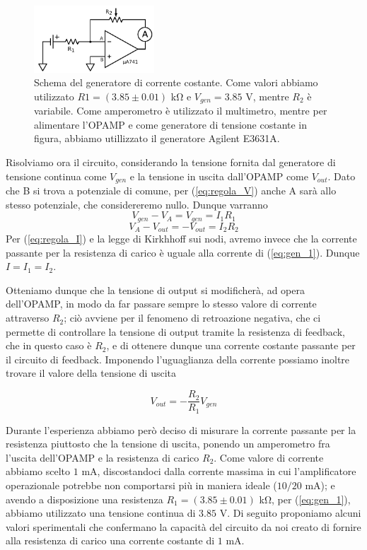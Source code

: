 \begin{figure}
  \begin{center}
    \includegraphics[width=0.40\textwidth]{../E01/latex/c1.pdf}
  \end{center}
  \caption{Schema del generatore di corrente costante. Come valori abbiamo utilizzato $R1=(3.85 \pm 0.01)$ \si{\kilo\ohm} e $V_{gen}=3.85$ \si{\volt}, mentre $R_2$ è variabile. Come amperometro è utilizzato il multimetro, mentre per alimentare l'OPAMP e come generatore di tensione costante in figura, abbiamo utillizzato il generatore Agilent E3631A.}
  \label{gen_continua}
\end{figure}

Risolviamo ora il circuito, considerando la tensione fornita dal generatore di tensione continua come $V_{gen}$ e la tensione in uscita dall'OPAMP come $V_{out}$. Dato che B si trova a potenziale di comune, per (\ref{eq:regola_V}) anche A sarà allo stesso potenziale, che considereremo nullo. Dunque varranno
\begin{equation}
V_{gen} - V_A = V_{gen} = I_1 R_1
\label{eq:gen_1}
\end{equation}
$$V_A-V_{out} = -V_{out} = I_2 R_2$$
Per (\ref{eq:regola_I}) e la legge di Kirkhhoff sui nodi, avremo invece che la corrente passante per la resistenza di carico è uguale alla corrente di (\ref{eq:gen_1}). Dunque $I=I_1=I_2$.

Otteniamo dunque che la tensione di output si modificherà, ad opera dell'OPAMP, in modo da far passare sempre lo stesso valore di corrente attraverso $R_2$; ciò avviene per il fenomeno di retroazione negativa, che ci permette di controllare la tensione di output tramite la resistenza di feedback, che in questo caso è $R_2$, e di ottenere dunque una corrente costante passante per il circuito di feedback. Imponendo l'uguaglianza della corrente possiamo inoltre trovare il valore della tensione di uscita

$$V_{out}=-\frac{R_2}{R_1} V_{gen}$$

Durante l'esperienza abbiamo però deciso di misurare la corrente passante per la resistenza piuttosto che la tensione di uscita, ponendo un amperometro fra l'uscita dell'OPAMP e la resistenza di carico $R_2$. Come valore di corrente abbiamo scelto $1$ \si{\milli\ampere}, discostandoci dalla corrente massima in cui l'amplificatore operazionale potrebbe non comportarsi più in maniera ideale ($10/20$ \si{\milli\ampere}); e avendo a disposizione una resistenza $R_1=(3.85 \pm 0.01)$ \si{\kilo\ohm}, per (\ref{eq:gen_1}), abbiamo utilizzato una tensione continua di $3.85$ \si{\volt}. Di seguito proponiamo alcuni valori sperimentali che confermano la capacità del circuito da noi creato di fornire alla resistenza di carico una corrente costante di $1$ \si{\milli\ampere}.

